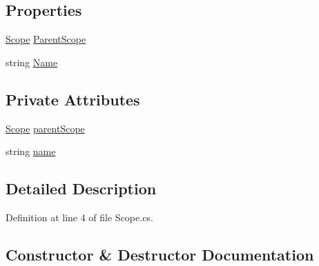 \subsection*{Properties}
\begin{DoxyCompactItemize}
\item 
\hyperlink{class_c_p_u___o_s___simulator_1_1_compiler_1_1_frontend_1_1_symbols_1_1_scope}{Scope} \hyperlink{class_c_p_u___o_s___simulator_1_1_compiler_1_1_frontend_1_1_symbols_1_1_scope_abac9b9beb5da3ae1395d91d223889809}{Parent\+Scope}
\item 
string \hyperlink{class_c_p_u___o_s___simulator_1_1_compiler_1_1_frontend_1_1_symbols_1_1_scope_a6f4db261e3efb4e1313c6c25c84f6b42}{Name}
\end{DoxyCompactItemize}
\subsection*{Private Attributes}
\begin{DoxyCompactItemize}
\item 
\hyperlink{class_c_p_u___o_s___simulator_1_1_compiler_1_1_frontend_1_1_symbols_1_1_scope}{Scope} \hyperlink{class_c_p_u___o_s___simulator_1_1_compiler_1_1_frontend_1_1_symbols_1_1_scope_a537054d49f16d026d1200a3e54a0274e}{parent\+Scope}
\item 
string \hyperlink{class_c_p_u___o_s___simulator_1_1_compiler_1_1_frontend_1_1_symbols_1_1_scope_aae43a88c5f7b9933735cf177cbf413e0}{name}
\end{DoxyCompactItemize}


\subsection{Detailed Description}


Definition at line 4 of file Scope.\+cs.



\subsection{Constructor \& Destructor Documentation}
\hypertarget{class_c_p_u___o_s___simulator_1_1_compiler_1_1_frontend_1_1_symbols_1_1_scope_ae8383693c3a694b25bd36c6223c1759c}{}

